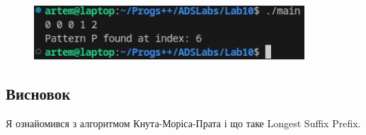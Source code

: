 \documentclass[12pt]{extarticle}
\begin{document}
\vspace{12pt}
\begin{figure}[H]
    \centering
    \includegraphics[width=0.90\textwidth]{Screenshot_20231129_090230}
    \caption{}
\end{figure}

\subsection*{Висновок} 

Я ознайомився з алгоритмом Кнута-Моріса-Прата і що таке Longest Suffix Prefix.
\end{document}
